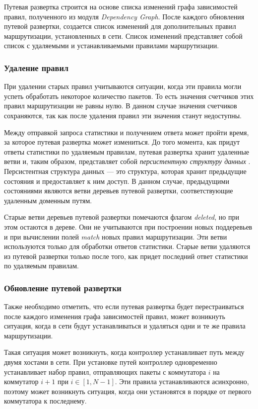 \documentclass[../thesis.tex]{subfiles}
\begin{document}
Путевая развертка строится на основе списка изменений графа зависимостей правил, полученного из модуля \textit{Dependency Graph}.
После каждого обновления путевой развертки, создается список изменений для дополнительных правил маршрутизации, установленных в сети.
Список изменений представляет собой список с удаляемыми и устанавливаемыми правилами маршрутизации.

\subsubsection{Удаление правил}

При удалении старых правил учитываются ситуации, когда эти правила могли успеть обработать некоторое количество пакетов.
То есть значения счетчиков этих правил маршрутизации не равны нулю.
В данном случае значения счетчиков сохраняются, так как после удаления правил эти значения станут недоступны.

Между отправкой запроса статистики и получением ответа может пройти время, за которое путевая развертка может измениться.
До того момента, как придут ответы статистики по удаляемым правилам, путевая развертка хранит удаленные ветви и, таким образом, представляет собой \textit{персистентную структуру данных} \cite{sarnak1986persistent}.
Персистентная структура данных --- это структура, которая хранит предыдущие состояния и предоставляет к ним доступ.
В данном случае, предыдущими состояниями являются ветви деревьев путевой развертки, соответствующие удаленным доменным путям.

Старые ветви деревьев путевой развертки помечаются флагом \textit{deleted}, но при этом остаются в дереве.
Они не учитываются при построении новых поддеревьев и при вычислении полей \textit{match} новых правил маршрутизации.
Эти ветви используются только для обработки ответов статистики.
Старые ветви удаляются из путевой развертки только после того, как придет последний ответ статистики по удаляемым правилам.

\subsubsection{Обновление путевой развертки}

Также необходимо отметить, что если путевая развертка будет перестраиваться после каждого изменения графа зависимостей правил, может возникнуть ситуация, когда в сети будут устанавливаться и удаляться одни и те же правила маршрутизации.

Такая ситуация может возникнуть, когда контроллер устанавливает путь между двумя хостами в сети.
При установке путей контроллер одновременно устанавливает набор правил, отправляющих пакеты с коммутатора $i$ на коммутатор $i+1$ при $i\in [1,N-1]$.
Эти правила устанавливаются асинхронно, поэтому может возникнуть ситуация, когда они установятся в порядке от первого коммутатора к последнему.
\end{document}
